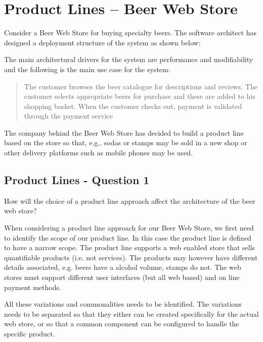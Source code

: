 \section{Product Lines -- Beer Web Store}
Consider a Beer Web Store for buying specialty beers. The software
architect has designed a deployment structure of the system as shown
below:
\begin{figure}[h!]
  \centerline{}
  \label{fig:observation}
\end{figure}
The main architectural drivers for the system are performance and
modifiability and the following is the main use case for the system:
\begin{quote}
  The customer browses the beer catalogue for descriptions and
  reviews. The customer selects appropriate beers for purchase and
  these are added to his shopping basket. When the customer checks
  out, payment is validated through the payment service
\end{quote}

The company behind the Beer Web Store has decided to build a product
line based on the store so that, e.g., sodas or stamps may be sold in
a new shop or other delivery platforms such as mobile phones may be
used.

\subsection{Product Lines - Question 1}

\begin{question}
How will the choice of a product line approach affect the
architecture of the beer web store?
\end{question}

When considering a product line approach for our Beer Web Store, we first need to identify the scope of our product line. In this case the product line is defined to have a narrow scope. The product line supports a web enabled store that sells quantifiable products (i.e. not services). The products may however have different details associated, e.g. beers have a alcohol volume, stamps do not. The web stores must support different user interfaces (but all web based) and on line payment methods.

All these variations and commonalities needs to be identified. The variations needs to be separated so that they either can be created specifically for the actual web store, or so that a common component can be configured to handle the specific product.

